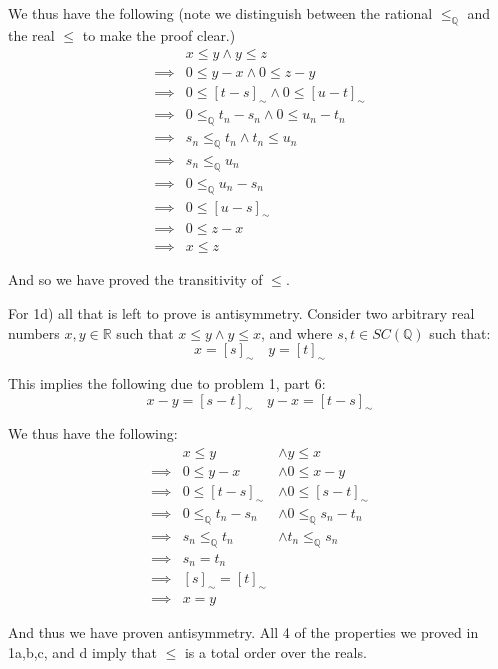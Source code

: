 \documentclass{article}
\begin{document}
We thus have the following (note we distinguish between the rational $\le_\mathbb Q$ and the real $\le$ to make the proof clear.)
\begin{align*}
    &x\le y\wedge y\le z\\
    \implies&0\le y-x\wedge 0\le z-y\tag{v}\\
    \implies&0\le [t-s]_\sim\wedge 0\le [u-t]_\sim\\
    \implies&0\le_\mathbb Q t_n-s_n\wedge 0\le u_n-t_n\\
    \implies&s_n\le_\mathbb Q t_n\wedge t_n\le u_n\\
    \implies&s_n\le_\mathbb Q u_n\tag{transitivity of $\le_\mathbb Q$}\\
    \implies&0\le_\mathbb Q u_n-s_n\\
    \implies&0\le [u-s]_\sim\\
    \implies&0\le z-x\\
    \implies&x\le z
\end{align*}

And so we have proved the transitivity of $\le$.
\medskip

For 1d) all that is left to prove is antisymmetry. Consider two arbitrary real numbers $x,y\in\mathbb R$ such that $x\le y\wedge y\le x$, and where $s,t\in SC(\mathbb Q)$ such that:
\begin{equation*}
    x=[s]_\sim\quad y=[t]_\sim
\end{equation*}

This implies the following due to problem 1, part 6:
\begin{equation*}
    x-y=[s-t]_\sim\quad y-x=[t-s]_\sim
\end{equation*}

We thus have the following:
\begin{align*}
    &x\le y&\wedge y\le x\\
    \implies&0\le y-x&\wedge 0\le x-y\\
    \implies&0\le [t-s]_\sim&\wedge 0\le [s-t]_\sim\\
    \implies&0\le_\mathbb Q t_n-s_n&\wedge 0\le_\mathbb Q s_n-t_n\\
    \implies&s_n\le_\mathbb Q t_n&\wedge t_n\le_\mathbb Q s_n\\
    \implies&s_n=t_n\tag{antisymmetry of $\le_\mathbb Q$}\\
    \implies&[s]_\sim=[t]_\sim\\
    \implies&x=y
\end{align*}

And thus we have proven antisymmetry. All 4 of the properties we proved in 1a,b,c, and d imply that $\le$ is a total order over the reals.
\bigskip
\end{document}
